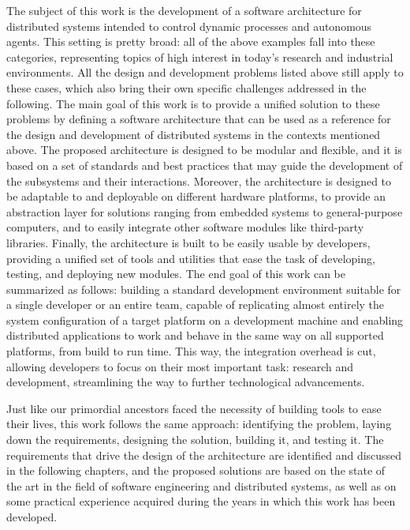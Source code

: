 The subject of this work is the development of a software architecture for distributed systems intended to control dynamic processes and autonomous agents. This setting is pretty broad: all of the above examples fall into these categories, representing topics of high interest in today's research and industrial environments. All the design and development problems listed above still apply to these cases, which also bring their own specific challenges addressed in the following. The main goal of this work is to provide a unified solution to these problems by defining a software architecture that can be used as a reference for the design and development of distributed systems in the contexts mentioned above. The proposed architecture is designed to be modular and flexible, and it is based on a set of standards and best practices that may guide the development of the subsystems and their interactions. Moreover, the architecture is designed to be adaptable to and deployable on different hardware platforms, to provide an abstraction layer for solutions ranging from embedded systems to general-purpose computers, and to easily integrate other software modules like third-party libraries. Finally, the architecture is built to be easily usable by developers, providing a unified set of tools and utilities that ease the task of developing, testing, and deploying new modules. The end goal of this work can be summarized as follows: building a standard development environment suitable for a single developer or an entire team, capable of replicating almost entirely the system configuration of a target platform on a development machine and enabling distributed applications to work and behave in the same way on all supported platforms, from build to run time. This way, the integration overhead is cut, allowing developers to focus on their most important task: research and development, streamlining the way to further technological advancements.

Just like our primordial ancestors faced the necessity of building tools to ease their lives, this work follows the same approach: identifying the problem, laying down the requirements, designing the solution, building it, and testing it. The requirements that drive the design of the architecture are identified and discussed in the following chapters, and the proposed solutions are based on the state of the art in the field of software engineering and distributed systems, as well as on some practical experience acquired during the years in which this work has been developed.
